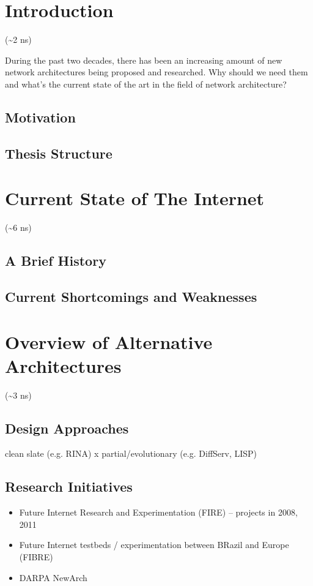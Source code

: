 
\newcommand{\todo}[1]{\textcolor{red}{textcolor\:} \TODO{gray}{#1}}

\chapter{Introduction}
	(\textasciitilde2 ns)

	During the past two decades, there has been an increasing amount of new network architectures being proposed and researched. Why should we need them and what's the current state of the art in the field of network architecture?

		\section{Motivation}
		\section{Thesis Structure}


\chapter{Current State of The Internet}
	(\textasciitilde6 ns)
	\section{A Brief History}
	\section{Current Shortcomings and Weaknesses}

\chapter{Overview of Alternative Architectures}
	(\textasciitilde3 ns)
	\section{Design Approaches}
		 clean slate (e.g. RINA) x partial/evolutionary (e.g. DiffServ, LISP)
	\section{Research Initiatives}
		\begin{itemize}
		\item Future Internet Research and Experimentation (FIRE) -- projects in 2008, 2011
		\item Future Internet testbeds / experimentation between BRazil and Europe (FIBRE)
		\item DARPA NewArch
		\end{itemize}

